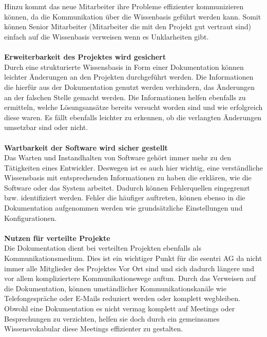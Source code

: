 \documentclass[a4paper,12pt]{scrartcl}
\begin{document}
\\\\
Hinzu kommt das neue Mitarbeiter ihre Probleme effizienter kommunizieren können, da die Kommunikation über die Wissenbasis geführt werden kann. Somit können Senior Mitarbeiter (Mitarbeiter die mit den Projekt gut vertraut sind) einfach auf die Wissenbasis verweisen wenn es Unklarheiten gibt. 
\\\\
\textbf{Erweiterbarkeit des Projektes wird gesichert}\\
Durch eine strukturierte Wissensbasis in Form einer Dokumentation können leichter Änderungen an den Projekten durchgeführt werden. Die Informationen die hierfür aus der Dokumentation genutzt werden verhindern, das Änderungen an der falschen Stelle gemacht werden. Die Informationen helfen ebenfalls zu ermitteln, welche Lösungsansätze bereits versucht worden sind und wie erfolgreich diese waren. Es fällt ebenfalls leichter zu erkennen, ob die verlangten Änderungen umsetzbar sind oder nicht.
\\\\
\textbf{Wartbarkeit der Software wird sicher gestellt}\\
Das Warten und Instandhalten von Software gehört immer mehr zu den Tätigkeiten eines Entwickler. Deswegen ist es auch hier wichtig, eine verständliche Wissensbasis mit entsprechenden Informationen zu haben die erklären, wie die Software oder das System arbeitet. Dadurch können Fehlerquellen eingegrenzt bzw. identifiziert werden. Fehler die häufiger auftreten, können ebenso in die Dokumentation aufgenommen werden wie grundsätzliche Einstellungen und Konfigurationen.
\\\\
\textbf{Nutzen für verteilte Projekte}\\
Die Dokumentation dient bei verteilten Projekten ebenfalls als Kommunikationsmedium. Dies ist ein wichtiger Punkt für die esentri AG da nicht immer alle Mitglieder des Projektes Vor Ort sind und sich dadurch längere und vor allem kompliziertere Kommunikationswege auftun. Durch das Verweisen auf die Dokumentation, können umständlicher Kommunikationskanäle wie Telefongespräche oder E-Mails reduziert werden oder komplett wegbleiben. Obwohl eine Dokumentation es nicht vermag komplett auf Meetings oder Besprechungen zu verzichten, helfen sie doch durch ein gemeinsames Wissensvokabular diese Meetings effizienter zu gestalten. 
\end{document}
